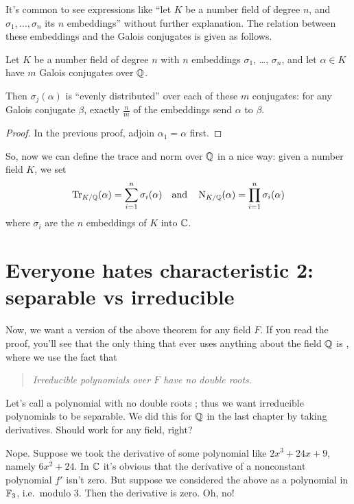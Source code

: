 It's common to see expressions like ``let $K$ be a number field of degree $n$,
and $\sigma_1, \dots, \sigma_n$ its $n$ embeddings'' without further explanation.
The relation between these embeddings and the Galois conjugates is given as follows.
\begin{theorem}
	\label{thm:conj_distrb}
	Let $K$ be a number field of degree $n$
	with $n$ embeddings $\sigma_1$, \dots, $\sigma_n$,
	and let $\alpha \in K$ have $m$ Galois conjugates over $\mathbb Q$.

	Then $\sigma_j(\alpha)$ is ``evenly distributed''
	over each of these $m$ conjugates: for any Galois conjugate $\beta$,
	exactly $\frac nm$ of the embeddings send $\alpha$ to $\beta$.
\end{theorem}
\begin{proof}
	In the previous proof, adjoin $\alpha_1 = \alpha$ first.
\end{proof}

So, now we can define the trace and norm over $\mathbb Q$ in a nice way:
given a number field $K$, we set
\[
	\operatorname{Tr}_{K/\mathbb Q}(\alpha) = \sum_{i=1}^n \sigma_i(\alpha)
	\quad\text{and}\quad
	\operatorname{N}_{K/\mathbb Q}(\alpha) = \prod_{i=1}^n \sigma_i(\alpha)
\]
where $\sigma_i$ are the $n$ embeddings of $K$ into $\mathbb C$.

\section{Everyone hates characteristic 2: separable vs irreducible}
Now, we want a version of the above theorem for any field $F$.
If you read the proof, you'll see that the only thing that ever uses anything about the field $\mathbb Q$
is , where we use the fact that
\begin{quote}
	\itshape Irreducible polynomials over $F$ have no double roots.
\end{quote}

Let's call a polynomial with no double roots ;
thus we want irreducible polynomials to be separable.
We did this for $\mathbb Q$ in the last chapter by taking derivatives.
Should work for any field, right?

Nope.
Suppose we took the derivative of some polynomial like $2x^3 + 24x + 9$,
namely $6x^2 + 24$.
In $\mathbb C$ it's obvious that the derivative of a nonconstant polynomial $f'$ isn't zero.
But suppose we considered the above as a polynomial in $\mathbb F_3$, i.e.\ modulo $3$.
Then the derivative is zero.
Oh, no!

